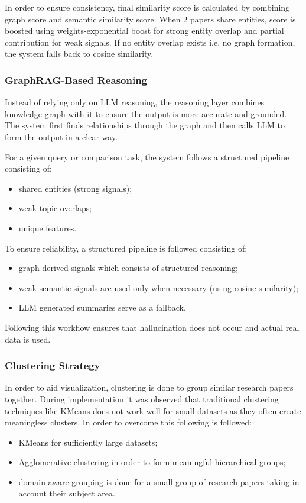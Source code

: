 \documentclass[10pt]{article}
\begin{document}
In order to ensure consistency, final similarity score is calculated by combining graph score and semantic similarity score. When 2 papers share entities, score is boosted using weights-exponential boost for strong entity overlap and partial contribution for weak signals. If no entity overlap exists i.e. no graph formation, the system falls back to cosine similarity.

\subsubsection{GraphRAG-Based Reasoning}
Instead of relying only on LLM reasoning, the reasoning layer combines knowledge graph with it to ensure the output is more accurate and grounded. The system first finds relationships through the graph and then calls LLM to form the output in a clear way.

For a given query or comparison task, the system follows a structured pipeline consisting of:
\begin{itemize}[leftmargin=*,noitemsep]
\item shared entities (strong signals);
\item weak topic overlaps;
\item unique features.
\end{itemize}

To ensure reliability, a structured pipeline is followed consisting of:
\begin{itemize}[leftmargin=*,noitemsep]
\item graph-derived signals which consists of structured reasoning;
\item weak semantic signals are used only when necessary (using cosine similarity);
\item LLM generated summaries serve as a fallback.
\end{itemize}

Following this workflow ensures that hallucination does not occur and actual real data is used.

\subsubsection{Clustering Strategy}
In order to aid visualization, clustering is done to group similar research papers together. During implementation it was observed that traditional clustering techniques like KMeans does not work well for small datasets as they often create meaningless clusters. In order to overcome this following is followed:
\begin{itemize}[leftmargin=*,noitemsep]
\item KMeans for sufficiently large datasets;
\item Agglomerative clustering in order to form meaningful hierarchical groups;
\item domain-aware grouping is done for a small group of research papers taking in account their subject area.
\end{itemize}
\end{document}
